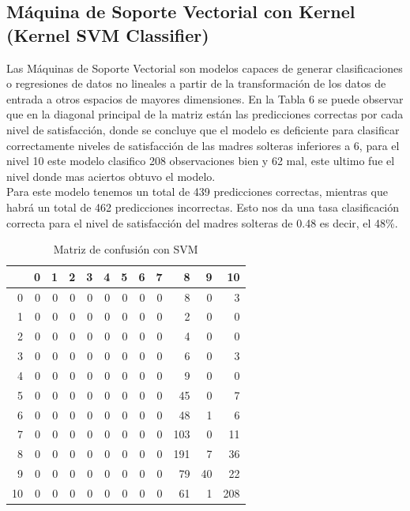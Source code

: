 \documentclass[11pt,twoside]{article}
\begin{document}
\subsection*{Máquina de Soporte Vectorial con Kernel (Kernel SVM Classifier)}
\noindent
Las Máquinas de Soporte Vectorial son modelos capaces de generar clasificaciones o regresiones de datos no lineales a partir de la transformación de los datos de entrada a otros espacios de mayores dimensiones. En la Tabla 6 se puede observar que en la diagonal principal de la matriz están las predicciones correctas por cada nivel de satisfacción, donde se concluye que el modelo es deficiente para clasificar correctamente niveles de satisfacción de las madres solteras inferiores a 6, para el nivel 10 este modelo clasifico 208 observaciones bien y 62  mal, este ultimo fue el nivel donde mas aciertos obtuvo el modelo. 
\\
Para este modelo tenemos un total de 439 predicciones correctas, mientras que habrá un total de 462 predicciones incorrectas. Esto nos da una tasa clasificación correcta para el nivel de satisfacción del madres solteras de  0.48 es decir,  el 48\%.



\begin{table}[H]
	\caption{\small{Matriz de confusión con SVM}}
	\centering
	\begin{tabular}{r|rrrrrrrrrrr}
		\hline
		& 0 & 1 & 2 & 3 & 4 & 5 & 6 & 7 & 8 & 9 & 10 \\ 
		\hline
		0 &   0 &   0 &   0 &   0 &   0 &   0 &   0 &   0 &   8 &   0 &   3 \\ 
		1 &   0 &   0 &   0 &   0 &   0 &   0 &   0 &   0 &   2 &   0 &   0 \\ 
		2 &   0 &   0 &   0 &   0 &   0 &   0 &   0 &   0 &   4 &   0 &   0 \\ 
		3 &   0 &   0 &   0 &   0 &   0 &   0 &   0 &   0 &   6 &   0 &   3 \\ 
		4 &   0 &   0 &   0 &   0 &   0 &   0 &   0 &   0 &   9 &   0 &   0 \\ 
		5 &   0 &   0 &   0 &   0 &   0 &   0 &   0 &   0 &  45 &   0 &   7 \\ 
		6 &   0 &   0 &   0 &   0 &   0 &   0 &   0 &   0 &  48 &   1 &   6 \\ 
		7 &   0 &   0 &   0 &   0 &   0 &   0 &   0 &   0 & 103 &   0 &  11 \\ 
		8 &   0 &   0 &   0 &   0 &   0 &   0 &   0 &   0 & 191 &   7 &  36 \\ 
		9 &   0 &   0 &   0 &   0 &   0 &   0 &   0 &   0 &  79 &  40 &  22 \\ 
		10 &   0 &   0 &   0 &   0 &   0 &   0 &   0 &   0 &  61 &   1 & 208 \\ 
		\hline
	\end{tabular}
\end{table}
\end{document}
